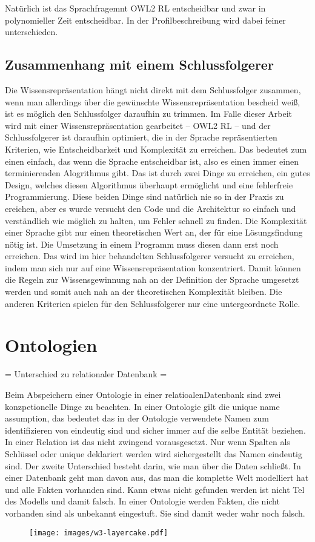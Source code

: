 
Natürlich ist das Sprachfragemnt OWL2 RL entscheidbar und zwar in polynomieller Zeit entscheidbar. In der Profilbeschreibung wird dabei feiner unterschieden.

\subsection{Zusammenhang mit einem Schlussfolgerer}
Die Wissensrepräsentation hängt nicht direkt mit dem Schlussfolger zusammen, wenn man allerdings über die gewünschte Wissensrepräsentation bescheid weiß, ist es möglich den Schlussfolger daraufhin zu trimmen. Im Falle dieser Arbeit wird mit einer Wissensrepräsentation gearbeitet -- OWL2 RL -- und der Schlussfolgerer ist daraufhin optimiert, die in der Sprache repräsentierten Kriterien, wie Entscheidbarkeit und Komplexität zu erreichen.
Das bedeutet zum einen einfach, das wenn die Sprache entscheidbar ist, also es einen immer einen terminierenden Alogrithmus gibt. Das ist durch zwei Dinge zu erreichen, ein gutes Design, welches diesen Algorithmus überhaupt ermöglicht und eine fehlerfreie Programmierung. Diese beiden Dinge sind natürlich nie so in der Praxis zu ereichen, aber es wurde versucht den Code und die Architektur so einfach und verständlich wie möglich zu halten, um Fehler schnell zu finden.
Die Komplexität einer Sprache gibt nur einen theoretischen Wert an, der für eine Lösungsfindung nötig ist. Die Umsetzung in einem Programm muss diesen dann erst noch erreichen. Das wird im hier behandelten Schlussfolgerer versucht zu erreichen, indem man sich nur auf eine Wissensrepräsentation konzentriert. Damit können die Regeln zur Wissensgewinnung nah an der Definition der Sprache umgesetzt werden und somit auch nah an der theoretischen Komplexität bleiben.
Die anderen Kriterien spielen für den Schlussfolgerer nur eine untergeordnete Rolle.

\section{Ontologien}
= Unterschied zu relationaler Datenbank =

Beim Abspeichern einer Ontologie in einer relatioalenDatenbank sind zwei konzpetionelle Dinge zu beachten. In einer Ontologie gilt die unique name assumption, das bedeutet das in der Ontologie verwendete Namen zum identifizieren von  eindeutig sind und sicher immer auf die selbe Entität beziehen. In einer Relation ist das nicht zwingend vorausgesetzt. Nur wenn Spalten als Schlüssel oder unique deklariert werden wird sichergestellt das Namen eindeutig sind.
Der zweite Unterschied besteht darin, wie man über die Daten schließt. In einer Datenbank geht man davon aus, das man die komplette Welt modelliert hat und alle Fakten vorhanden sind. Kann etwas nicht gefunden werden ist nicht Tel des Modells und damit falsch. In einer Ontologie werden Fakten, die nicht vorhanden sind als unbekannt eingestuft. Sie sind damit weder wahr noch falsch.
\begin{figure}
\texttt{[image: images/w3-layercake.pdf]}
\end{figure}

